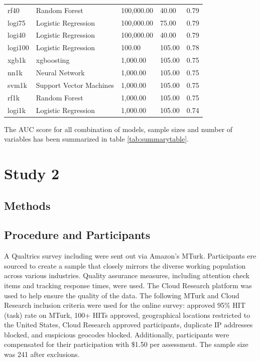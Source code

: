 \documentclass[
  man]{apa7}
\begin{document}
\begin{table}[tbp]
\begin{center}
\begin{threeparttable}
\begin{tabular}{lllll}
rf40 & Random Forest & 100,000.00 & 40.00 & 0.79\\
logi75 & Logistic Regression & 100,000.00 & 75.00 & 0.79\\
logi40 & Logistic Regression & 100,000.00 & 40.00 & 0.79\\
logi100 & Logistic Regression & 100.00 & 105.00 & 0.78\\
xgb1k & xgboosting & 1,000.00 & 105.00 & 0.75\\
nn1k & Neural Network & 1,000.00 & 105.00 & 0.75\\
svm1k & Support Vector Machines & 1,000.00 & 105.00 & 0.75\\
rf1k & Random Forest & 1,000.00 & 105.00 & 0.75\\
logi1k & Logistic Regression & 1,000.00 & 105.00 & 0.74\\
\bottomrule
\end{tabular}

\end{threeparttable}
\end{center}

\end{table}

The AUC score for all combination of models, sample sizes and number of variables has been summarized in table \ref{tab:summarytable}.

\hypertarget{study-2}{%
\section{Study 2}\label{study-2}}

\hypertarget{methods-1}{%
\subsection{Methods}\label{methods-1}}

\hypertarget{procedure-and-participants-1}{%
\subsection{Procedure and Participants}\label{procedure-and-participants-1}}

A Qualtrics survey including were sent out via Amazon's MTurk. Participants ere sourced to create a sample that closely mirrors the diverse working population across various industries. Quality assurance measures, including attention check items and tracking response times, were used. The Cloud Research platform was used to help ensure the quality of the data. The following MTurk and Cloud Research inclusion criteria were used for the online survey: approved 95\% HIT (task) rate on MTurk, 100+ HITs approved, geographical locations restricted to the United States, Cloud Research approved participants, duplicate IP addresses blocked, and suspicious geocodes blocked. Additionally, participants were compensated for their participation with \$1.50 per assessment. The sample size was 241 after exclusions.
\end{document}
